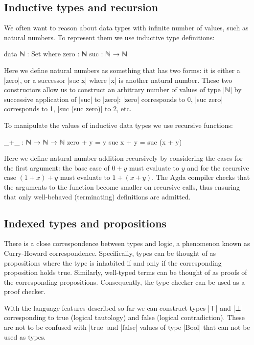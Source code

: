 \subsection{Inductive types and recursion}

We often want to reason about data types with infinite number of values, such as natural numbers.
To represent them we use inductive type definitions:

\begin{code}
data ℕ : Set where
  zero : ℕ
  suc : ℕ → ℕ
\end{code}

Here we define natural numbers as something that has two forms: it is either a |zero|, or a successor |suc x| where |x| is another natural number. These two constructors allow us to construct an arbitrary number of values of type |ℕ| by successive application of |suc| to |zero|: |zero| corresponds to 0, |suc zero| corresponds to 1, |suc (suc zero)| to 2, etc.

To manipulate the values of inductive data types we use recursive functions:

\begin{code}
_+_ : ℕ → ℕ → ℕ
zero + y = y
suc x + y = suc (x + y)
\end{code}

Here we define natural number addition recursively by considering the cases for the first argument: the base case of $0 + y$ must evaluate to $y$ and for the recursive case $(1 + x) + y$ must evaluate to $1 + (x + y)$. The Agda compiler checks that the arguments to the function become smaller on recursive calls, thus ensuring that only well-behaved (terminating) definitions are admitted.

\subsection{Indexed types and propositions}

There is a close correspondence between types and
logic, a phenomenon known as Curry-Howard correspondence. Specifically, types can be thought of as propositions where the type is inhabited if and only 
if the corresponding proposition holds true. Similarly, well-typed terms can be thought of as proofs 
of the corresponding propositions. Consequently, the type-checker can be used as a proof checker.

With the language features described so far we can construct types |⊤| and |⊥| corresponding to true (logical tautology) and false (logical contradiction). These are not to be confused with |true| and |false| values of type |Bool| that can not be used as types.

